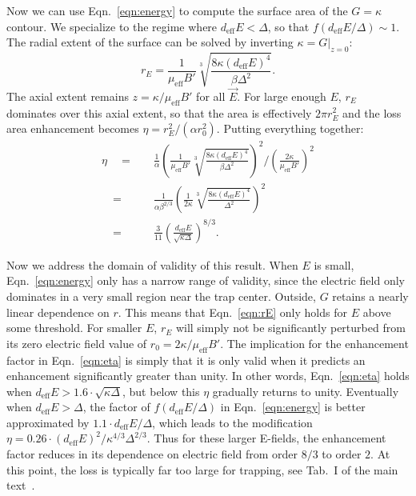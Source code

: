 \documentclass[%
 reprint,
 amsmath,amssymb,
 aps,
prl,
]{revtex4-1}
\begin{document}
Now we can use Eqn.~\ref{eqn:energy} to compute the surface area of the $G=\kappa$ contour.
We specialize to the regime where $d_\text{eff}E<\Delta$, so that $f(d_\text{eff}E/\Delta)\sim 1$.
The radial extent of the surface can be solved by inverting $\kappa=G|_{z=0}$:
\begin{equation}
\label{eqn:rE}
r_E = \frac{1}{\mu_\text{eff}B'}\sqrt[3]{\frac{8\kappa(d_\text{eff}E)^4}{\beta\Delta^2}}.
\end{equation}
The axial extent remains $z=\kappa/\mu_\text{eff}B'$ for all $\vec{E}$.
For large enough $E$, $r_E$ dominates over this axial extent, so that the area is effectively $2\pi r_E^2$ and the loss area enhancement becomes $\eta = r_E^2/(\alpha r_0^2)$.
Putting everything together:
\begin{equation}
\begin{split}
\label{eqn:eta}
\eta\quad =&\quad \frac{1}{\alpha}\left(\frac{1}{\mu_\text{eff}B'}\sqrt[3]{\frac{8\kappa(d_\text{eff}E)^4}{\beta\Delta^2}}\right)^2\bigg/\left(\frac{2\kappa}{\mu_\text{eff}B'}\right)^2\\
\quad=&\quad \frac{1}{\alpha\beta^{2/3}}\left(\frac{1}{2\kappa}\sqrt[3]{\frac{8\kappa(d_\text{eff}E)^4}{\Delta^2}}\right)^2\\
\quad=&\quad\frac{3}{11}\left(\frac{d_\text{eff}E}{\sqrt{\kappa\Delta}}\right)^{8/3}.
\end{split}
\end{equation}

Now we address the domain of validity of this result.
When $E$ is small, Eqn.~\ref{eqn:energy} only has a narrow range of validity, since the electric field only dominates in a very small region near the trap center.
Outside, $G$ retains a nearly linear dependence on $r$.
This means that Eqn.~\ref{eqn:rE} only holds for $E$ above some threshold.
For smaller $E$, $r_E$ will simply not be significantly perturbed from its zero electric field value of $r_0=2\kappa/\mu_\text{eff}B'$.
The implication for the enhancement factor in Eqn.~\ref{eqn:eta} is simply that it is only valid when it predicts an enhancement significantly greater than unity.
In other words, Eqn.~\ref{eqn:eta} holds when $d_\text{eff}E>1.6\!\cdot\!\sqrt{\kappa\Delta}$, but below this $\eta$ gradually returns to unity.
Eventually when $d_\text{eff}E>\Delta$, the factor of $f(d_\text{eff}E/\Delta)$ in Eqn.~\ref{eqn:energy} is better approximated by $1.1\!\cdot\!d_\text{eff}E/\Delta$, which leads to the modification $\eta=0.26\!\cdot\!(d_\text{eff}E)^2/\kappa^{4/3}\Delta^{2/3}$.
Thus for these larger E-fields, the enhancement factor reduces in its dependence on electric field from order $8/3$ to order $2$.
At this point, the loss is typically far too large for trapping, see Tab.~I of the main text~\cite{smt}.



\end{document}
